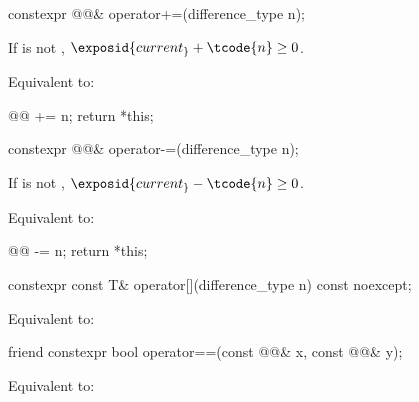 %
\begin{itemdecl}
constexpr @@& operator+=(difference_type n);
\end{itemdecl}

\begin{itemdescr}
\pnum
\expects
If  is not ,
$\exposid{current_} + \tcode{n} \ge 0$.

\pnum
\effects
Equivalent to:
\begin{codeblock}
@@ += n;
return *this;
\end{codeblock}
\end{itemdescr}

%
\begin{itemdecl}
constexpr @@& operator-=(difference_type n);
\end{itemdecl}

\begin{itemdescr}
\pnum
\expects
If  is not ,
$\exposid{current_} - \tcode{n} \ge 0$.

\pnum
\effects
Equivalent to:
\begin{codeblock}
@@ -= n;
return *this;
\end{codeblock}
\end{itemdescr}

%
\begin{itemdecl}
constexpr const T& operator[](difference_type n) const noexcept;
\end{itemdecl}

\begin{itemdescr}
\pnum
\effects
Equivalent to: 
\end{itemdescr}

%
\begin{itemdecl}
friend constexpr bool operator==(const @@& x, const @@& y);
\end{itemdecl}

\begin{itemdescr}
\pnum
\effects
Equivalent to: 
\end{itemdescr}

